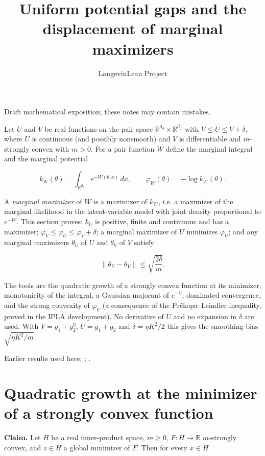 \documentclass[11pt,a4paper]{article}
\title{\texorpdfstring{Uniform potential gaps and the displacement of marginal maximizers}{Uniform potential gaps and the displacement of marginal maximizers}}
\author{LangevinLean Project}
\date{}
\begin{document}
\maketitle
Draft mathematical exposition; these notes may contain mistakes.


Let \(U\) and \(V\) be real functions on the pair space \(\mathbb R^{d_\theta}\times\mathbb R^{d_x}\) with \(V\le U\le V+\delta\), where \(U\) is continuous (and possibly nonsmooth) and \(V\) is differentiable and \(m\)-strongly convex with \(m>0\). For a pair function \(W\) define the marginal integral and the marginal potential


\[k_W(\theta)=\int_{\mathbb R^{d_x}}e^{-W(\theta,x)}\,dx,\qquad\varphi_W(\theta)=-\log k_W(\theta).\]


A \emph{marginal maximizer} of \(W\) is a maximizer of \(k_W\), i.e. a maximizer of the marginal likelihood in the latent-variable model with joint density proportional to \(e^{-W}\). This section proves: \(k_U\) is positive, finite and continuous and has a maximizer; \(\varphi_V\le\varphi_U\le\varphi_V+\delta\); a marginal maximizer of \(U\) minimizes \(\varphi_U\); and any marginal maximizers \(\theta_U\) of \(U\) and \(\theta_V\) of \(V\) satisfy


\[\|\theta_U-\theta_V\|\le\sqrt{\frac{2\delta}{m}} .\]


The tools are the quadratic growth of a strongly convex function at its minimizer, monotonicity of the integral, a Gaussian majorant of \(e^{-V}\), dominated convergence, and the strong convexity of \(\varphi_V\) (a consequence of the Prékopa–Leindler inequality, proved in the IPLA development). No derivative of \(U\) and no expansion in \(\delta\) are used. With \(V=g_1+g_2^\eta\), \(U=g_1+g_2\) and \(\delta=\eta K^2/2\) this gives the smoothing bias \(\sqrt{\eta K^2/m}\).



Earlier results used here: \cite[Section~3.12]{LangevinLean2026IPLA}; \cite[Section~3.49]{LangevinLean2026ULASC}.

\section{\texorpdfstring{Quadratic growth at the minimizer of a strongly convex function}{Quadratic growth at the minimizer of a strongly convex function}}


\textbf{Claim.} Let \(H\) be a real inner-product space, \(m\ge0\), \(F:H\to\mathbb R\) \(m\)-strongly convex, and \(z\in H\) a global minimizer of \(F\). Then for every \(x\in H\)
\end{document}
